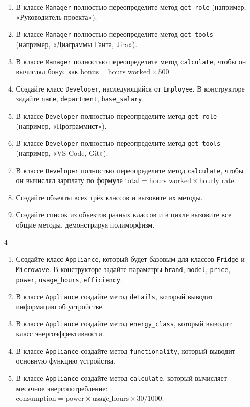 \begin{enumerate}
\begin{enumerate}
    \item В классе \texttt{Manager} полностью переопределите метод \texttt{get\_role} (например, «Руководитель проекта»).
    \item В классе \texttt{Manager} полностью переопределите метод \texttt{get\_tools} (например, «Диаграммы Ганта, Jira»).
    \item В классе \texttt{Manager} полностью переопределите метод \texttt{calculate}, чтобы он вычислял бонус как \( \text{bonus} = \text{hours\_worked} \times 500 \).
    \item Создайте класс \texttt{Developer}, наследующийся от \texttt{Employee}. В конструкторе задайте \texttt{name}, \texttt{department}, \texttt{base\_salary}.
    \item В классе \texttt{Developer} полностью переопределите метод \texttt{get\_role} (например, «Программист»).
    \item В классе \texttt{Developer} полностью переопределите метод \texttt{get\_tools} (например, «VS Code, Git»).
    \item В классе \texttt{Developer} полностью переопределите метод \texttt{calculate}, чтобы он вычислял зарплату по формуле \( \text{total} = \text{hours\_worked} \times \text{hourly\_rate} \).
    \item Создайте объекты всех трёх классов и вызовите их методы.
    \item Создайте список из объектов разных классов и в цикле вызовите все общие методы, демонстрируя полиморфизм.
\end{enumerate}
\item[4]
\begin{enumerate}
    \item Создайте класс \texttt{Appliance}, который будет базовым для классов \texttt{Fridge} и \texttt{Microwave}. В конструкторе задайте параметры \texttt{brand}, \texttt{model}, \texttt{price}, \texttt{power}, \texttt{usage\_hours}, \texttt{efficiency}.
    \item В классе \texttt{Appliance} создайте метод \texttt{details}, который выводит информацию об устройстве.
    \item В классе \texttt{Appliance} создайте метод \texttt{energy\_class}, который выводит класс энергоэффективности.
    \item В классе \texttt{Appliance} создайте метод \texttt{functionality}, который выводит основную функцию устройства.
    \item В классе \texttt{Appliance} создайте метод \texttt{calculate}, который вычисляет месячное энергопотребление: \( \text{consumption} = \text{power} \times \text{usage\_hours} \times 30 / 1000 \).

\end{enumerate}
\end{enumerate}
